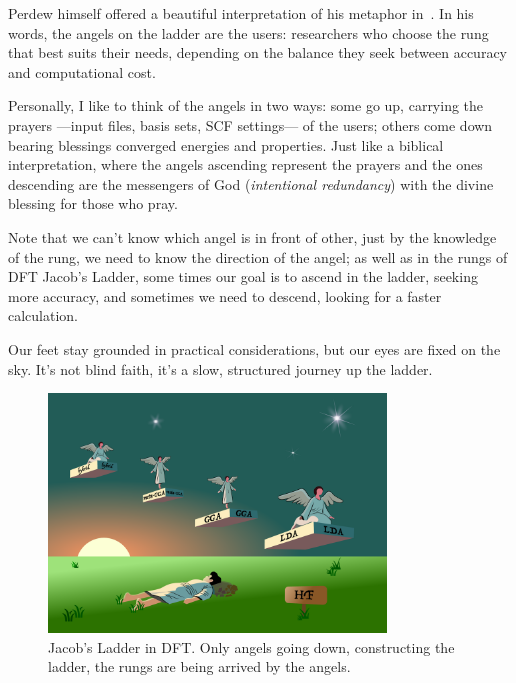 \newpage
Perdew himself offered a beautiful interpretation of his metaphor
in~\cite{Perdew2013}. In his words, the angels on the ladder are the users:
researchers who choose the rung that best suits their needs, depending on
the balance they seek between accuracy and computational cost.

Personally, I like to think of the angels in two ways: some go up, carrying the
prayers ---input files, basis sets, SCF settings--- of the users; others come
down bearing blessings converged energies and properties. Just like a biblical
interpretation, where the angels ascending represent the prayers and the ones
descending are the messengers of God (\emph{intentional redundancy}) with the divine
blessing for those who pray.

Note that we can't know which angel is in front of other, just by the
knowledge of the rung, we need to know the direction of the angel; as well
as in the rungs of \gls{DFT} Jacob's Ladder, some times our goal is
to ascend in the ladder, seeking more accuracy, and sometimes we need to
descend, looking for a faster calculation.

Our feet stay grounded in practical considerations, but our eyes are fixed on
the sky. It's not blind faith, it's a slow, structured journey up the ladder.

\begin{figure}
  \centering
  \includegraphics[width=0.8\textwidth]{img/JacobLader.pdf}
  \caption{Jacob's Ladder in \gls{DFT}. Only angels going down, constructing
    the ladder, the rungs are being arrived by the angels.}
\end{figure}


